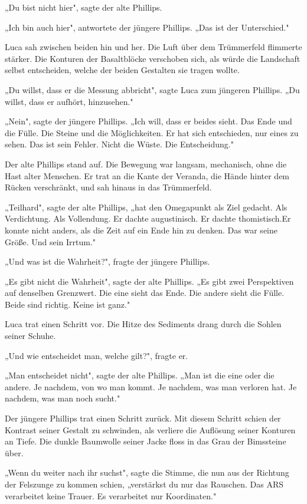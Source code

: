 \documentclass[
  ngerman,
]{article}
\begin{document}
„Du bist nicht hier", sagte der alte Phillips.

„Ich bin auch hier", antwortete der jüngere Phillips. „Das ist der
Unterschied."

Luca sah zwischen beiden hin und her. Die Luft über dem Trümmerfeld
flimmerte stärker. Die Konturen der Basaltblöcke verschoben sich, als
würde die Landschaft selbst entscheiden, welche der beiden Gestalten sie
tragen wollte.

„Du willst, dass er die Messung abbricht", sagte Luca zum jüngeren
Phillips. „Du willst, dass er aufhört, hinzusehen."

„Nein", sagte der jüngere Phillips. „Ich will, dass er beides sieht. Das
Ende und die Fülle. Die Steine und die Möglichkeiten. Er hat sich
entschieden, nur eines zu sehen. Das ist sein Fehler. Nicht die Wüste.
Die Entscheidung."

Der alte Phillips stand auf. Die Bewegung war langsam, mechanisch, ohne
die Hast alter Menschen. Er trat an die Kante der Veranda, die Hände
hinter dem Rücken verschränkt, und sah hinaus in das Trümmerfeld.

„Teilhard", sagte der alte Phillips, „hat den Omegapunkt als Ziel
gedacht. Als Verdichtung. Als Vollendung. Er dachte augustinisch. Er
dachte thomistisch.Er konnte nicht anders, als die Zeit auf ein Ende hin
zu denken. Das war seine Größe. Und sein Irrtum."

„Und was ist die Wahrheit?", fragte der jüngere Phillips.

„Es gibt nicht die Wahrheit", sagte der alte Phillips. „Es gibt zwei
Perspektiven auf denselben Grenzwert. Die eine sieht das Ende. Die
andere sieht die Fülle. Beide sind richtig. Keine ist ganz."

Luca trat einen Schritt vor. Die Hitze des Sediments drang durch die
Sohlen seiner Schuhe.

„Und wie entscheidet man, welche gilt?", fragte er.

„Man entscheidet nicht", sagte der alte Phillips. „Man ist die eine oder
die andere. Je nachdem, von wo man kommt. Je nachdem, was man verloren
hat. Je nachdem, was man noch sucht."

Der jüngere Phillips trat einen Schritt zurück. Mit diesem Schritt
schien der Kontrast seiner Gestalt zu schwinden, als verliere die
Auflösung seiner Konturen an Tiefe. Die dunkle Baumwolle seiner Jacke
floss in das Grau der Bimssteine über.

„Wenn du weiter nach ihr suchst", sagte die Stimme, die nun aus der
Richtung der Felszunge zu kommen schien, „verstärkst du nur das
Rauschen. Das ARS verarbeitet keine Trauer. Es verarbeitet nur
Koordinaten."
\end{document}
